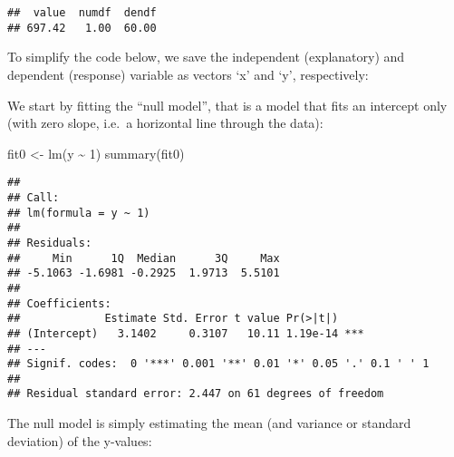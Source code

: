 \documentclass[
]{article}
\newenvironment{Shaded}{\begin{snugshade}}{\end{snugshade}}
\newcommand{\CommentTok}[1]{\textcolor[rgb]{0.56,0.35,0.01}{\textit{#1}}}
\newcommand{\DecValTok}[1]{\textcolor[rgb]{0.00,0.00,0.81}{#1}}
\newcommand{\FunctionTok}[1]{\textcolor[rgb]{0.00,0.00,0.00}{#1}}
\newcommand{\NormalTok}[1]{#1}
\newcommand{\OtherTok}[1]{\textcolor[rgb]{0.56,0.35,0.01}{#1}}
\newcommand{\SpecialCharTok}[1]{\textcolor[rgb]{0.00,0.00,0.00}{#1}}
\begin{document}
\begin{Shaded}
\end{Shaded}

\begin{verbatim}
##  value  numdf  dendf 
## 697.42   1.00  60.00
\end{verbatim}

To simplify the code below, we save the independent (explanatory) and
dependent (response) variable as vectors `x' and `y', respectively:

\begin{Shaded}
\end{Shaded}

We start by fitting the ``null model'', that is a model that fits an
intercept only (with zero slope, i.e.~a horizontal line through the
data):

\begin{Shaded}
\begin{Highlighting}[]
\NormalTok{fit0 }\OtherTok{\textless{}{-}} \FunctionTok{lm}\NormalTok{(y }\SpecialCharTok{\textasciitilde{}} \DecValTok{1}\NormalTok{)}
\FunctionTok{summary}\NormalTok{(fit0)}
\end{Highlighting}
\end{Shaded}

\begin{verbatim}
## 
## Call:
## lm(formula = y ~ 1)
## 
## Residuals:
##     Min      1Q  Median      3Q     Max 
## -5.1063 -1.6981 -0.2925  1.9713  5.5101 
## 
## Coefficients:
##             Estimate Std. Error t value Pr(>|t|)    
## (Intercept)   3.1402     0.3107   10.11 1.19e-14 ***
## ---
## Signif. codes:  0 '***' 0.001 '**' 0.01 '*' 0.05 '.' 0.1 ' ' 1
## 
## Residual standard error: 2.447 on 61 degrees of freedom
\end{verbatim}

The null model is simply estimating the mean (and variance or standard
deviation) of the y-values:
\end{document}
